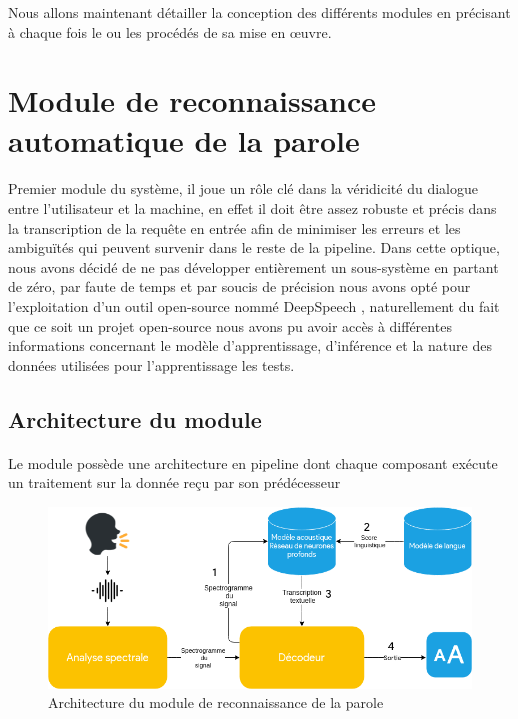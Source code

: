 	\par
	Nous allons maintenant détailler la conception des différents modules en précisant à chaque fois le ou les procédés de sa mise en œuvre. 
\section{Module de reconnaissance automatique de la parole}
\paragraph{}
\label{asr_probs}
Premier module du système, il joue un rôle clé dans la véridicité du dialogue entre l'utilisateur et la machine, en effet il doit être assez robuste et précis dans la transcription de la requête en entrée afin de minimiser les erreurs et les ambiguïtés qui peuvent survenir dans le reste de la pipeline. Dans cette optique, nous avons décidé de ne pas développer entièrement un sous-système en partant de zéro, par faute de temps et par soucis de précision nous avons opté pour l'exploitation d'un outil open-source nommé DeepSpeech \cite{deepspeech_paper}, naturellement du fait que ce soit un projet open-source nous avons pu avoir accès à différentes informations concernant le modèle d'apprentissage, d'inférence et la nature des données utilisées pour l'apprentissage les tests.
	\subsection{Architecture du module}
	\paragraph{}
	Le module possède une architecture en pipeline dont chaque composant exécute un traitement sur la donnée reçu par son prédécesseur
	\begin{figure}[H] 
		\centering
		\includegraphics[width=0.88\linewidth]{images/Conception/ASR/schema.png}
		\caption{Architecture du module de reconnaissance de la parole}
	\end{figure}
